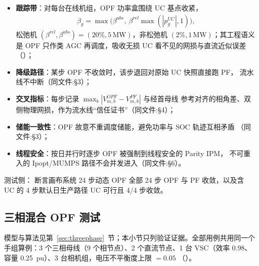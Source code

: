 \begin{itemize}
  \item \textbf{跟踪带}：对每台在线机组，OPF 功率盒围绕 UC 基点收紧，
        \begin{align*}
        \beta_g=\max\bigl(\beta^{abs},\ \beta^{rel}\max(|p^{UC}_g|,1)\bigr),
        \end{align*}
        松弛机 $(\beta^{rel},\beta^{abs})=(20\%,5\,\mathrm{MW})$，非松弛机
        $(2\%,1\,\mathrm{MW})$；其工程语义是 OPF 只作类 AGC 再调度，吸收无损 UC
        看不见的网损与直流近似误差（）；
  \item \textbf{降级路径}：某步 OPF 不收敛时，该步退回对原始 UC 快照直接跑 PF，
        流水线不中断（同文件:§3）；
  \item \textbf{交叉指标}：每步记录 $\max_b|V_{m,b}^{OPF}-V_{m,b}^{PF}|$ 与经首母线
        参考对齐的相角差、双侧物理网损，作为流水线“信任证书”（同文件:§4）；
  \item \textbf{储能一致性}：OPF 故意不重调度储能，避免功率与 SOC 轨迹互相矛盾
        （同文件:§3）；
  \item \textbf{线程安全}：按日并行时逐步 OPF 被强制到线程安全的 Parity IPM，
        不可重入的 Ipopt/MUMPS 路径不会并发进入（同文件:§6）。
\end{itemize}

测试侧： 断言画布系统 24 步动态
OPF 全部 24 步 OPF 与 PF 收敛，以及含 UC 的 4 步默认日生产路径 UC 可行且
4/4 步收敛。

\subsection{三相混合 OPF 测试}\label{subsec:ver:threephase}

模型与算法见第~\ref{sec:threephase}~节；本小节只列验证证据。全部用例共用同一个
手组算例：3 个三相母线（9 个相节点）、2 个直流节点、1 台 VSC（效率 0.98、容量
0.25~pu）、3 台相机组，电压不平衡度上限 $=0.05$
（）。

